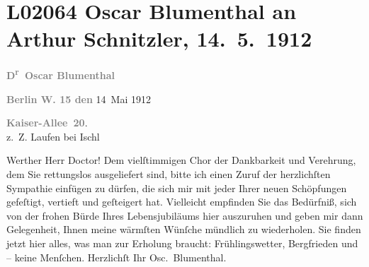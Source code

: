 

\section[Oscar Blumenthal an Arthur Schnitzler, 14. 5. 1912]{L02064 Oscar Blumenthal an Arthur Schnitzler, 14. 5. 1912}
\nopagebreak{}
\rehead{ }\normalsize\beginnumbering{}
\toendnotes[C]{\smallbreak\pagebreak[2]}
\toendnotes[C]{\smallbreak}
\pstart
           
\pstart
           {\pb}\textcolor{gray}{\textbf{D\textsuperscript{r} Oscar Blumenthal}}\pend
           
\pstart
           \raggedleft{}\textcolor{gray}{\textbf{Berlin W. 15 den}}{ }14 Mai 1912\pend
           \pend
           
\pstart
           \raggedleft{}\textcolor{gray}{\textbf{Kaiser-Allee 20}}.{\\}z. Z. Laufen bei Ischl\pend
           
\pstart\center{}Werther Herr Doctor!\pend\vspace{0.5em}
\pstart
           Dem vielſtimmigen Chor der Dankbarkeit und Verehrung, dem Sie \label{K_L02064-1v}\label{K_L02064-1} rettungslos ausgeliefert sind, bitte ich einen
               Zuruf der herzlichſten Sympathie einfügen zu dürfen, die sich mir mit jeder Ihrer
               neuen Schöpfungen gefeſtigt, vertieft und geſteigert hat. Vielleicht empfinden Sie
               das Bedürfniß, sich von der frohen Bürde Ihres Lebensjubiläums hier auszuruhen und
               geben mir dann Gelegenheit, Ihnen meine wärmſten Wünſche mündlich zu wiederholen. Sie
               finden jetzt hier alles, was man zur Erholung braucht: Frühlingswetter, Bergfrieden
               und – keine Menſchen. Herzlichſt Ihr\pend
           \pstart \spacefill\mbox{Osc. Blumenthal.}\pend{}\endnumbering{}  
      
